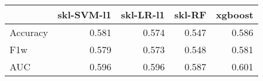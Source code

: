 \begin{tabular}{lrrrr}
\toprule
{} &  skl-SVM-l1 &  skl-LR-l1 &  skl-RF &  xgboost \\
\midrule
Accuracy &       0.581 &      0.574 &   0.547 &    0.586 \\
F1w      &       0.579 &      0.573 &   0.548 &    0.581 \\
AUC      &       0.596 &      0.596 &   0.587 &    0.601 \\
\bottomrule
\end{tabular}
